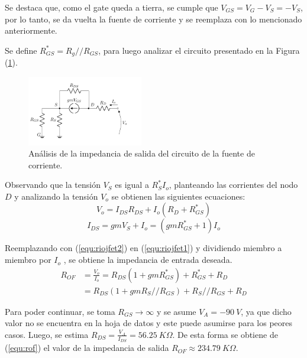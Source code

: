 Se destaca que, como el gate queda a tierra, se cumple que $V_{GS} = V_G - V_S = - V_S$, por lo tanto, se da vuelta la fuente de corriente y se reemplaza con lo mencionado anteriormente. 

Se define $R_{GS}^* = R_g // R_{GS}$, para luego analizar el circuito presentado en la Figura (\ref{fig:incfuente2}).
\begin{figure}[H]
\centering
\hspace*{2cm}
	\includegraphics[width=0.45\textwidth, page=2]{Imagenes/ModeloIncremental.pdf}
	\caption{Análisis de la impedancia de salida del circuito de la fuente de corriente.}
\label{fig:incfuente2}
\end{figure}

Observando que la tensión $V_S$ es igual a $R_{S}^{*} I_o$, planteando las corrientes del nodo $D$ y analizando la tensión $V_o$ se obtienen las siguientes ecuaciones:
\begin{equation}
	V_o = I_{DS} R_{DS} + I_o \left( R_D + R_{GS}^* \right)
	\label{equ:riojfet1}
\end{equation}
\begin{equation}
	I_{DS} = gm V_S + I_o = \left( gm R_{GS}^* + 1 \right) I_o
	\label{equ:riojfet2}
\end{equation}

Reemplazando con (\ref{equ:riojfet2}) en (\ref{equ:riojfet1}) y dividiendo miembro a miembro por $I_o$ , se obtiene la impedancia de entrada deseada.
\begin{equation}
\begin{split}
	R_{OF} & = \frac{V_o}{I_o} = R_{DS} \left( 1 + gm R_{GS}^* \right) + R_{GS}^* + R_D \\
		   & = R_{DS} \left( 1 + gm R_S//R_{GS} \right) + R_S//R_{GS} + R_D
\end{split}
\label{equ:rof}
\end{equation}

Para poder continuar, se toma $R_{GS} \longrightarrow \infty$ y se asume $V_A = -90 \ V$, ya que dicho valor no se encuentra en la hoja de datos y este puede asumirse para los peores casos. Luego, se estima $R_{DS} = \frac{V_A}{I_{DS}} = 56.25 \ K\Omega$. De esta forma se obtiene de (\ref{equ:rof}) el valor de la impedancia de salida $R_{OF} \approx 234.79 \ K\Omega$.


